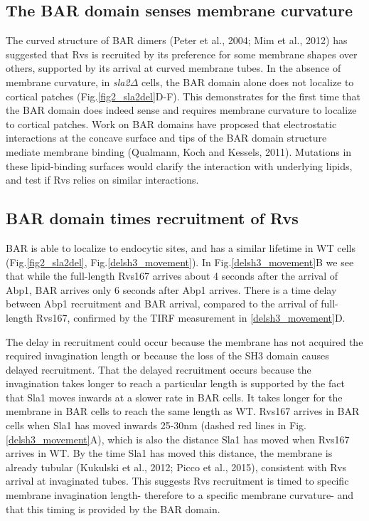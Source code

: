\subsection{The BAR domain senses membrane curvature}
The curved structure of BAR dimers (Peter et al., 2004; Mim et al., 2012) has suggested that Rvs is recruited by its preference for some membrane shapes over others, supported by its arrival at curved membrane tubes. In the absence of membrane curvature, in \textit{sla2$\Delta$} cells, the BAR domain alone does not localize to cortical patches (Fig.\ref{fig2_sla2del}D-F). This demonstrates for the first time that the BAR domain does indeed sense and requires membrane curvature to localize to cortical patches. Work on BAR domains have proposed that electrostatic interactions at the concave surface and tips of the BAR domain structure  mediate membrane binding (Qualmann, Koch and Kessels, 2011). Mutations in these lipid-binding surfaces would clarify the interaction with underlying lipids, and test if Rvs relies on similar interactions.



\subsection{BAR domain times recruitment of Rvs} 

BAR is able to localize to endocytic sites, and has a similar lifetime in WT cells (Fig.\ref{fig2_sla2del}, Fig.\ref{delsh3_movement}). In Fig.\ref{delsh3_movement}B we see that while the full-length Rvs167 arrives about 4 seconds after the arrival of Abp1, BAR arrives only 6 seconds after Abp1 arrives. There is a time delay between Abp1 recruitment and BAR arrival, compared to the arrival of full-length Rvs167, confirmed by the TIRF measurement in \ref{delsh3_movement}D. 

	\vspace{5mm}
The delay in recruitment could occur because the membrane has not acquired the required invagination length or because the loss of the SH3 domain causes delayed recruitment. That the delayed recruitment occurs because the invagination takes longer to reach a particular length is supported by the fact that Sla1 moves inwards at a slower rate in BAR cells. It takes longer for the membrane in BAR cells to reach the same length as WT. Rvs167 arrives in BAR cells when Sla1 has moved inwards 25-30nm (dashed red lines in Fig.\ref{delsh3_movement}A), which is also the distance Sla1 has moved when Rvs167 arrives in WT. By the time Sla1 has moved this distance, the membrane is already tubular (Kukulski et al., 2012; Picco et al., 2015), consistent with Rvs arrival at invaginated tubes. This suggests Rvs recruitment is timed to specific membrane invagination length- therefore to a specific membrane curvature- and that this timing is provided by the BAR domain. 



